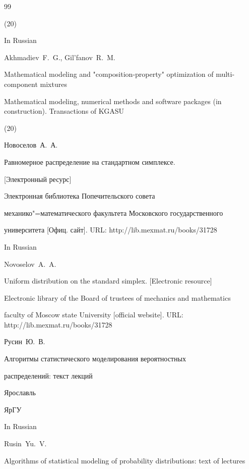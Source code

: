 \begin{thebibliography}{99}

(20)

\misctransl

\lang In Russian

\by Akhmadiev~F.~G., Gil'fanov~R.~M.

\paper Mathematical modeling and "composition-property" optimization of multi-component mixtures

\jour Mathematical modeling, numerical methods and software packages (in construction). Transactions of KGASU


(20)




\by Новоселов~А.~А.

\paper Равномерное распределение на стандартном симплексе.

[Электронный ресурс]

\inbook Электронная библиотека Попечительского совета

механико"=математического факультета Московского государственного

университета [Офиц. сайт]. URL: http://lib.mexmat.ru/books/31728

\misctransl

\lang In Russian

\by Novoselov~A.~A.

\paper Uniform distribution on the standard simplex.  [Electronic resource]

\inbook Electronic library of the Board of trustees of mechanics and mathematics

faculty of Moscow state University [official website]. URL: http://lib.mexmat.ru/books/31728






\by   Русин~Ю.~В.

\book Алгоритмы статистического моделирования вероятностных

распределений: текст лекций

\publaddr Ярославль

\publ ЯрГУ


\misctransl

\lang In Russian

\by Rusin~Yu.~V.

\book Algorithms of statistical modeling of probability distributions: text of lectures


\end{thebibliography}
